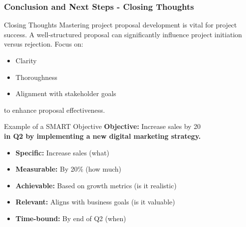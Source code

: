 \documentclass[aspectratio=169]{beamer}
\begin{document}
\begin{frame}[fragile]
    \frametitle{Conclusion and Next Steps - Closing Thoughts}
    
    \begin{block}{Closing Thoughts}
        Mastering project proposal development is vital for project success. A well-structured proposal can significantly influence project initiation versus rejection. 
        Focus on:
        \begin{itemize}
            \item Clarity
            \item Thoroughness
            \item Alignment with stakeholder goals
        \end{itemize}
        to enhance proposal effectiveness.
    \end{block}
    
    \begin{block}{Example of a SMART Objective}
        \textbf{Objective:} Increase sales by 20\\ 
        \textbf{in Q2 by implementing a new digital marketing strategy.}
        
        \begin{itemize}
            \item \textbf{Specific:} Increase sales (what)
            \item \textbf{Measurable:} By 20\% (how much)
            \item \textbf{Achievable:} Based on growth metrics (is it realistic)
            \item \textbf{Relevant:} Aligns with business goals (is it valuable)
            \item \textbf{Time-bound:} By end of Q2 (when)
        \end{itemize}
    \end{block}
\end{frame}
\end{document}
